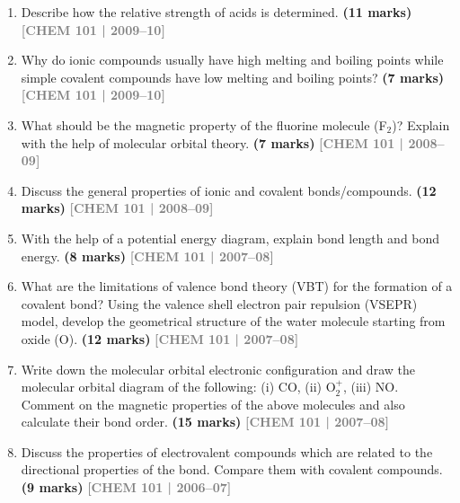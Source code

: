 \documentclass[12pt,a3paper]{article}
\newcommand{\yr}[1]{\hfill\textcolor{gray}{\small\textbf{[#1]}}}
\newcommand{\mk}[1]{\textcolor{orange!70!black}{\small\textbf{(#1 marks)}}}
\begin{document}
\begin{enumerate}
\item Describe how the relative strength of acids is determined. \mk{11}
\yr{CHEM 101 | 2009--10}



\item Why do ionic compounds usually have high melting and boiling points while simple covalent compounds have low melting and boiling points? \mk{7}
\yr{CHEM 101 | 2009--10}




\item What should be the magnetic property of the fluorine molecule (F$_2$)? Explain with the help of molecular orbital theory. \mk{7}
\yr{CHEM 101 | 2008--09}




\item Discuss the general properties of ionic and covalent bonds/compounds. \mk{12}
\yr{CHEM 101 | 2008--09}




\item With the help of a potential energy diagram, explain bond length and bond energy. \mk{8}
\yr{CHEM 101 | 2007--08}




\item What are the limitations of valence bond theory (VBT) for the formation of a covalent bond? Using the valence shell electron pair repulsion (VSEPR) model, develop the geometrical structure of the water molecule starting from oxide (O). \mk{12}
\yr{CHEM 101 | 2007--08}




\item Write down the molecular orbital electronic configuration and draw the molecular orbital diagram of the following: (i) CO, (ii) O$_2^+$, (iii) NO. Comment on the magnetic properties of the above molecules and also calculate their bond order. \mk{15}
\yr{CHEM 101 | 2007--08}





\item Discuss the properties of electrovalent compounds which are related to the directional properties of the bond. Compare them with covalent compounds. \mk{9}
\yr{CHEM 101 | 2006--07}




\end{enumerate}
\end{document}
